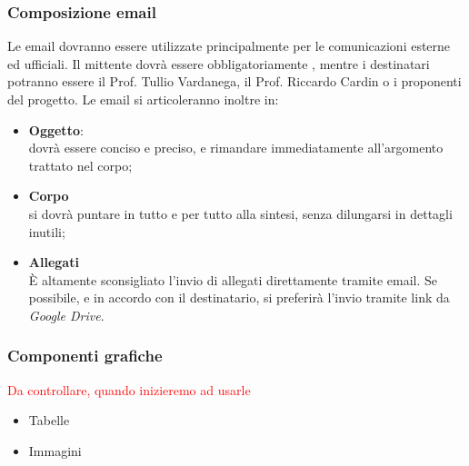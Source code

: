 \subsubsection{Composizione email}
Le email dovranno essere utilizzate principalmente per le comunicazioni esterne ed ufficiali. Il mittente dovrà essere obbligatoriamente \indirizzo,
mentre i destinatari potranno essere il Prof. Tullio Vardanega, il Prof. Riccardo Cardin o i proponenti del progetto. Le email si articoleranno inoltre in:
\begin{itemize}
	\item \textbf{Oggetto}:
	~\\dovrà essere conciso e preciso, e rimandare immediatamente all'argomento trattato nel corpo;
	\item \textbf{Corpo}
	~\\si dovrà puntare in tutto e per tutto alla sintesi, senza dilungarsi in dettagli inutili;
	\item \textbf{Allegati}
	~\\È altamente sconsigliato l'invio di allegati direttamente tramite email. Se possibile, e in accordo con il destinatario, si preferirà l'invio tramite link da \emph{Google Drive}.
\end{itemize} 

\subsubsection{Componenti grafiche}
\textcolor{red}{Da controllare, quando inizieremo ad usarle}
\begin{itemize}
	\item Tabelle
	\item Immagini
\end{itemize}
